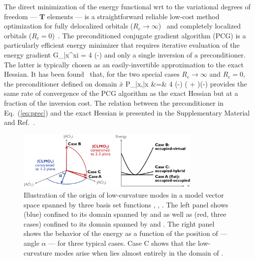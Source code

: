 \documentclass[aps,prl,twocolumn,reprint,amsmath,amssymb]{revtex4-1}
\begin{document}
The direct minimization of the energy functional wrt to the variational degrees of freedom --- $\mathbf{T}$ elements --- is a straightforward reliable low-cost method optimization for fully delocalized orbitals ($R_c \rightarrow \infty$)~\cite{galli1992large,OT,GDM, Cayley-minimizer} and completely localized orbitals ($R_c = 0$)~\cite{khaliullin2013efficient}. The preconditioned conjugate gradient algorithm (PCG) is a particularly efficient energy minimizer that requires iterative evaluation of the energy gradient
%
\bea \label{eq:grad}
{G_{\bar{x}\mu}}^{xi} \equiv {} = 4  (-)  
\eea
%
and only a single inversion of a preconditioner. The latter is typically chosen as an easily-invertible approximation to the exact Hessian. It has been found~\cite{khaliullin2013efficient} that, for the two special cases $R_c \rightarrow \infty$ and $R_c = 0$, the preconditioner defined on domain $\bar{x}$
%
\bea \label{eq:prec}
P_{\bar{x}\mu,\bar{x}\nu} &=& 4  (-) ( + )(-)  
\eea
%
provides the same rate of convergence of the PCG algorithm as the exact Hessian but at a fraction of the inversion cost. The relation between the preconditioner in Eq.~(\ref{eq:prec}) and the exact Hessian is presented in the Supplementary Material and Ref.~.

\begin{figure}
\centering
\includegraphics[width=0.8\textwidth]{modes}
\caption{Illustration of the origin of low-curvature modes in a model vector space spanned by three basis set functions , , . The left panel shows  (blue) confined to its domain spanned by  and  as well as   (red, three cases) confined to its domain spanned by  and . The right panel shows the behavior of the energy as a function of the position of  --- angle $\alpha$ --- for three typical cases. Case C shows that the low-curvature modes arise when   lies almost entirely in the domain of .}
\label{fig:modes}
\end{figure}
\end{document}
